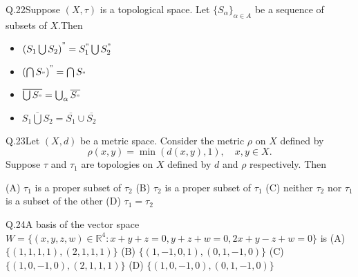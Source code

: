 \documentclass{article}
\begin{document}
																													Q.22\quad Suppose $(X, \tau)$ is a topological space. Let $\{S_\alpha\}_{\alpha \in A}$ be a sequence of subsets of $X$.\newline Then
																													\begin{itemize}
																													    \item[(A)] $\left(S_1\bigcup S_2\right)^" = S_1^" \bigcup S_2^" $
																													        \item[(B)] $\left(\bigcap S_"\right)^" = \bigcap S_"$
																														    \item[(C)] $\overline{\bigcup S_"} = \bigcup_\alpha \overline{S_"}$
																														        \item[(D)] $\overline{S_1\bigcup S_2} = \overline{S_1} \cup \overline{S_2}$
																															\end{itemize}
																															\vspace{1cm}

																															Q.23\quad Let $(X, d)$ be a metric space. Consider the metric $\rho$ on $X$ defined by
																															\[
																															\rho(x,y) = \min(d(x,y), 1), \quad x,y \in X.
																															\]
																															Suppose $\tau$ and $\tau_1$ are topologies on $X$ defined by $d$ and $\rho$ respectively. Then

																															\noindent (A)  $\tau_1$ is a proper subset of $\tau_2$ \hspace{6cm} (B)  $\tau_2$ is a proper subset of $\tau_1$
																															\newline \noindent (C) neither $\tau_2$ nor $\tau_1$ is a subset of the other \hspace{4cm}  (D) $\tau_1 = \tau_2$

																															\vspace{1em}


																															Q.24\quad A basis of the vector space $W = \{(x,y,z,w) \in \mathbb{R}^4 : x + y + z = 0, y + z + w = 0, 2x + y - z + w = 0\}$ is
																															\newline
																															\noindent (A) $\{(1,1,1,1), (2,1,1,1)\}$ \hspace{6cm} (B) $\{(1,-1,0,1), (0,1,-1,0)\}$
																															\newline \noindent (C) $\{(1,0,-1,0), (2,1,1,1)\}$\hspace{5.75cm}  (D) $\{(1,0,-1,0), (0,1,-1,0)\}$
																															\vspace{1em}
\end{document}
